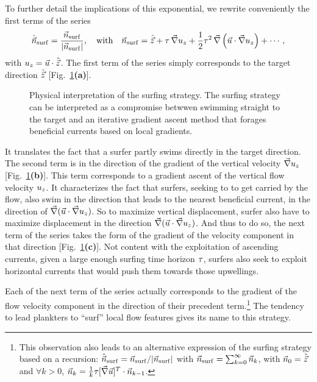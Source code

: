 To further detail the implications of this exponential, we rewrite conveniently the first terms of the series
\begin{equation}
	\hat{\vec{n}}_{\mathrm{surf}} = \frac{\vec{n}_{\mathrm{surf}}}{\lvert\vec{n}_{\mathrm{surf}}\rvert}, \quad \text{with} \quad 
	\vec{n}_{\mathrm{surf}} = \hat{\vec{z}} + \tau \, \vec{\nabla} u_z + \frac{1}{2} \tau^2 \, \vec{\nabla} \left( \vec{u} \cdot \vec{\nabla} u_z \right) + \dotsb,
\end{equation}
with $u_z = \vec{u} \cdot \hat{\vec{z}}$.
The first term of the series simply corresponds to the target direction $\hat{\vec{z}}$ [Fig.~\ref{fig:physical_interpretation}\textbf{(a)}].
\begin{figure}%
	\centering
	\def\svgwidth{\textwidth}
	
	\caption[Physical interpretation of the surfing strategy.]{
		Physical interpretation of the surfing strategy. The surfing strategy can be interpreted as a compromise betwwen swimming straight to the target and an iterative gradient ascent method that forages beneficial currents based on local gradients.
	}
	\label{fig:physical_interpretation}
\end{figure}
It translates the fact that a surfer partly swims directly in the target direction.
The second term is in the direction of the gradient of the vertical velocity $\vec{\nabla} u_z$ [Fig.~\ref{fig:physical_interpretation}\textbf{(b)}]. 
This term corresponds to a gradient ascent of the vertical flow velocity $u_z$.
It characterizes the fact that surfers, seeking to to get carried by the flow, also swim in the direction that leads to the nearest beneficial current, in the direction of $\vec{\nabla} ( \vec{u} \cdot \vec{\nabla} u_z )$.
So to maximize vertical displacement, surfer also have to maximize displacement in the direction $\vec{\nabla} ( \vec{u} \cdot \vec{\nabla} u_z )$.
And thus to do so, the next term of the series takes the form of the gradient of the velocity component in that direction [Fig.~\ref{fig:physical_interpretation}\textbf{(c)}].
Not content with the exploitation of ascending currents, given a large enough surfing time horizon $\tau$, surfers also seek to exploit horizontal currents that would push them towards those upwellings.

Each of the next term of the series actually corresponds to the gradient of the flow velocity component in the direction of their precedent term.\footnote{This observation also leads to an alternative expression of the surfing strategy based on a recursion:
$\hat{\vec{n}}_{\mathrm{surf}} = \vec{n}_{\mathrm{surf}}/\lvert\vec{n}_{\mathrm{surf}}\rvert$ with $\vec{n}_{\mathrm{surf}} = \sum_{k = 0}^{\infty} \vec{n}_{k}$, with $\vec{n}_{0} = \hat{\vec{z}}$ and $\forall k > 0$, $\vec{n}_{k} = \frac{1}{k} \tau [ \vec{\nabla} \vec{u} ]^T \cdot \vec{n}_{k-1}$.}
The tendency to lead plankters to ``surf'' local flow features gives its name to this strategy.

